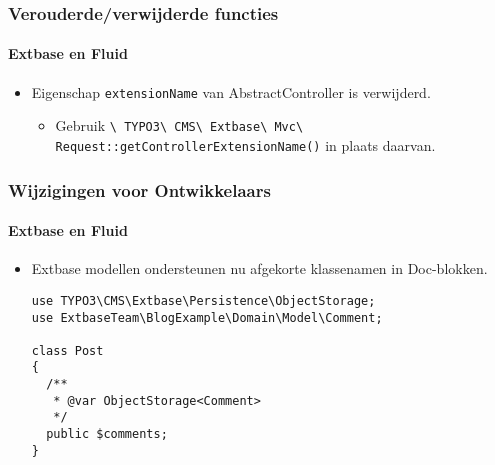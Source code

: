 \begin{frame}[fragile]
	\frametitle{Verouderde/verwijderde functies}
	\framesubtitle{Extbase en Fluid}

	\begin{itemize}
		\item Eigenschap \texttt{extensionName} van AbstractController is verwijderd.

			\begin{itemize}\smaller
				\item[\ding{228}] Gebruik \texttt{\textbackslash
					TYPO3\textbackslash
					CMS\textbackslash
					Extbase\textbackslash
					Mvc\textbackslash
					Request::getControllerExtensionName()} in plaats daarvan.
			\end{itemize}\normalsize

	\end{itemize}

\end{frame}


\begin{frame}[fragile]
	\frametitle{Wijzigingen voor Ontwikkelaars}
	\framesubtitle{Extbase en Fluid}

	\lstset{basicstyle=\tiny\ttfamily}

	\begin{itemize}
		\item Extbase modellen ondersteunen nu afgekorte klassenamen in Doc-blokken.

\begin{lstlisting}
use TYPO3\CMS\Extbase\Persistence\ObjectStorage;
use ExtbaseTeam\BlogExample\Domain\Model\Comment;

class Post
{
  /**
   * @var ObjectStorage<Comment>
   */
  public $comments;
}
\end{lstlisting}

	\end{itemize}

\end{frame}


